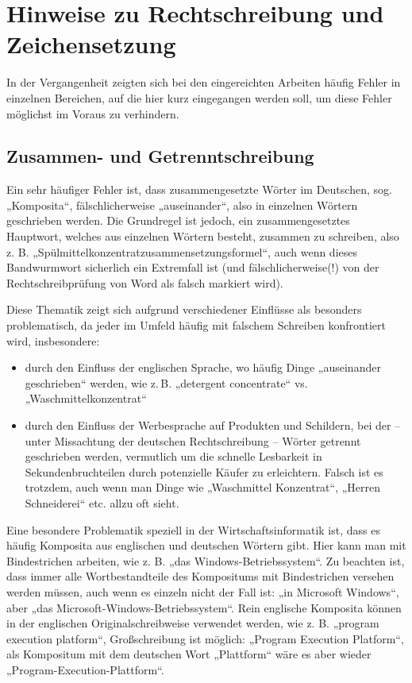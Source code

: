 \section{Hinweise zu Rechtschreibung und Zeichensetzung}

In der Vergangenheit zeigten sich bei den eingereichten Arbeiten häufig Fehler in einzelnen Bereichen, auf die hier kurz eingegangen werden soll, um diese Fehler möglichst im Voraus zu verhindern.

\subsection{Zusammen- und Getrenntschreibung}

Ein sehr häufiger Fehler ist, dass zusammengesetzte Wörter im Deutschen, sog. „Komposita“, fälschlicherweise „auseinander“, also in einzelnen Wörtern geschrieben werden. Die Grundregel ist jedoch, ein zusammengesetztes Hauptwort, welches aus einzelnen Wörtern besteht, zusammen zu schreiben, also z. B. „Spülmittelkonzentratzusammensetzungsformel“, auch wenn dieses Bandwurmwort sicherlich ein Extremfall ist (und fälschlicherweise(!) von der Rechtschreibprüfung von Word als falsch markiert wird).

Diese Thematik zeigt sich aufgrund verschiedener Einflüsse als besonders problematisch, da jeder im Umfeld häufig mit falschem Schreiben konfrontiert wird, insbesondere:

\begin{itemize}
    \item durch den Einfluss der englischen Sprache, wo häufig Dinge „auseinander geschrieben“ werden, wie z.\,B. „detergent concentrate“ vs. „Waschmittelkonzentrat“
    
    \item durch den Einfluss der Werbesprache auf Produkten und Schildern, bei der – unter Missachtung der deutschen Rechtschreibung – Wörter getrennt geschrieben werden, vermutlich um die schnelle Lesbarkeit in Sekundenbruchteilen durch potenzielle Käufer zu erleichtern. Falsch ist es trotzdem, auch wenn man Dinge wie „Waschmittel Konzentrat“, „Herren Schneiderei“ etc. allzu oft sieht.
\end{itemize}

Eine besondere Problematik speziell in der Wirtschaftsinformatik ist, dass es häufig Komposita aus englischen und deutschen Wörtern gibt. Hier kann man mit Bindestrichen arbeiten, wie z. B. „das Windows-Betriebssystem“. Zu beachten ist, dass immer alle Wortbestandteile des Kompositums mit Bindestrichen versehen werden müssen, auch wenn es einzeln nicht der Fall ist: „in Microsoft Windows“, aber „das Microsoft-Windows-Betriebssystem“. Rein englische Komposita können in der englischen Originalschreibweise verwendet werden, wie z. B. „program execution platform“, Großschreibung ist möglich: „Program Execution Platform“, als Kompositum mit dem deutschen Wort „Plattform“ wäre es aber wieder „Program-Execution-Plattform“.

